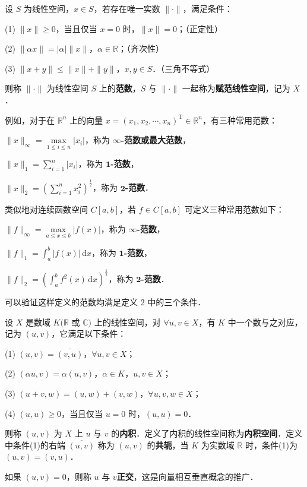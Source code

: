 \documentclass[../../main.tex]{subfiles}
\begin{document}
\begin{definition}[范数]
设 \( S \) 为线性空间，\( x \in S \)，若存在唯一实数 \( \|\cdot\| \)，满足条件：

(1) \( \|x\| \geqslant 0 \)，当且仅当 \( x = 0 \) 时，\( \|x\| = 0 \)；（正定性）

(2) \( \|\alpha x\| = |\alpha| \|x\| \)，\( \alpha \in \mathbb{R} \)；（齐次性）

(3) \( \|x + y\| \leqslant \|x\| + \|y\| \)，\( x, y \in S \)．（三角不等式）

则称 \( \|\cdot\| \) 为线性空间 \( S \) 上的\textbf{范数}，\( S \) 与 \( \|\cdot\| \) 一起称为\textbf{赋范线性空间}，记为 \( X \)．
\end{definition}
\begin{note}
例如，对于在 \( \mathbb{R}^n \) 上的向量 \( x = (x_1, x_2, \cdots, x_n)^{\mathrm{T}} \in \mathbb{R}^n \)，有三种常用范数：

\( \|x\|_{\infty} = \max\limits_{1 \leqslant i \leqslant n} |x_i| \)，称为 \( \mathbf{\infty } \)\textbf{-范数或最大范数}，

\( \|x\|_1 = \sum\limits_{i=1}^n |x_i| \)，称为 $\mathbf{1}$\textbf{-范数}，

\( \|x\|_2 = \left( \sum\limits_{i=1}^n x_i^2 \right)^{\frac{1}{2}} \)，称为 $\mathbf{2}$\textbf{-范数}．

类似地对连续函数空间 \( C[a,b] \)，若 \( f \in C[a,b] \) 可定义三种常用范数如下：

\( \|f\|_{\infty} = \max\limits_{a \leqslant x \leqslant b} |f(x)| \)，称为 \( \mathbf{\infty }\)\textbf{-范数}，

\( \|f\|_1 = \int_a^b |f(x)| \, \mathrm{d}x \)，称为 $\mathbf{1}$\textbf{-范数}，

\( \|f\|_2 = \left( \int_a^b f^2(x) \, \mathrm{d}x \right)^{\frac{1}{2}} \)，称为 $\mathbf{2}$\textbf{-范数}．

可以验证这样定义的范数均满足定义 2 中的三个条件．
\end{note}

\begin{definition}
设 \( X \) 是数域 \( K(\mathbb{R} \) 或 \( \mathbb{C}) \) 上的线性空间，对 \( \forall u, v \in X \)，有 \( K \) 中一个数与之对应，记为 \( (u, v) \)，它满足以下条件：

(1) \( (u, v) = \overline{(v, u)} \)，\( \forall u, v \in X \)；

(2) \( (\alpha u, v) = \alpha (u, v) \)，\( \alpha \in K \)，\( u, v \in X \)；

(3) \( (u + v, w) = (u, w) + (v, w) \)，\( \forall u, v, w \in X \)；

(4) \( (u, u) \geqslant 0 \)，当且仅当 \( u = 0 \) 时，\( (u, u) = 0 \)．

则称 \( (u, v) \) 为 \( X \) 上 \( u \) 与 \( v \) 的\textbf{内积}．定义了内积的线性空间称为\textbf{内积空间}．定义中条件(1)的右端 \( \overline{(u, v)} \) 称为 \( (u, v) \) 的\textbf{共轭}，当 \( K \) 为实数域 \( \mathbb{R} \) 时，条件(1)为 \( (u, v) = (v, u) \)．

如果 \( (u, v) = 0 \)，则称 \( u \) 与 \( v \)\textbf{正交}，这是向量相互垂直概念的推广．
\end{definition}
\end{document}
